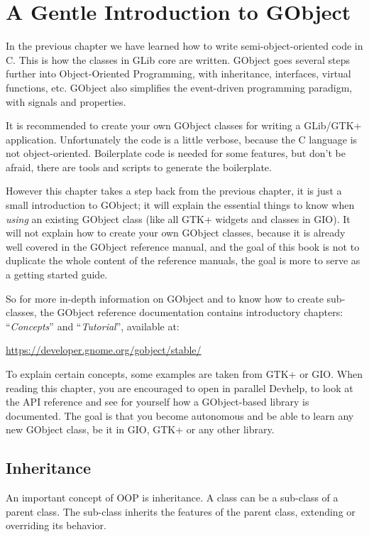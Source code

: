 \chapter{A Gentle Introduction to GObject}
\label{oop-gobject}

In the previous chapter we have learned how to write semi-object-oriented code in C. This is how the classes in GLib core are written. GObject goes several steps further into Object-Oriented Programming, with inheritance, interfaces, virtual functions, etc. GObject also simplifies the event-driven programming paradigm, with signals and properties.

It is recommended to create your own GObject classes for writing a GLib/GTK+ application. Unfortunately the code is a little verbose, because the C language is not object-oriented. Boilerplate code is needed for some features, but don't be afraid, there are tools and scripts to generate the boilerplate.

However this chapter takes a step back from the previous chapter, it is just a small introduction to GObject; it will explain the essential things to know when \emph{using} an existing GObject class (like all GTK+ widgets and classes in GIO). It will not explain how to create your own GObject classes, because it is already well covered in the GObject reference manual, and the goal of this book is not to duplicate the whole content of the reference manuals, the goal is more to serve as a getting started guide.

So for more in-depth information on GObject and to know how to create sub-classes, the GObject reference documentation contains introductory chapters: ``\emph{Concepts}'' and ``\emph{Tutorial}'', available at:

\url{https://developer.gnome.org/gobject/stable/}

To explain certain concepts, some examples are taken from GTK+ or GIO. When reading this chapter, you are encouraged to open in parallel Devhelp, to look at the API reference and see for yourself how a GObject-based library is documented. The goal is that you become autonomous and be able to learn any new GObject class, be it in GIO, GTK+ or any other library.

\section{Inheritance}

An important concept of OOP is inheritance. A class can be a sub-class of a parent class. The sub-class inherits the features of the parent class, extending or overriding its behavior.

